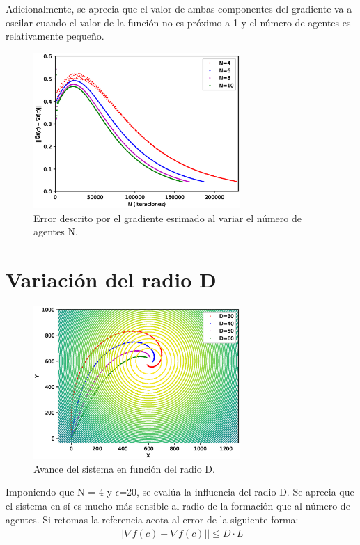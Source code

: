 Adicionalmente, se aprecia que el valor de ambas componentes del gradiente va a oscilar cuando el valor de la función no es próximo a 1 y el número de agentes es relativamente pequeño.

\begin{figure}[H]
\centering
\includegraphics[width=0.70\textwidth]{figures/Graficas_Nuevas/N/Figure_5.eps}
\caption{Error descrito por el gradiente esrimado al variar el número de agentes N.} \label{N_Var_Error}
\end{figure}

\section{Variación del radio D}

\begin{figure}[H]
\centering
\includegraphics[width=0.70\textwidth]{figures/Dif_R_BU/Figure_1.eps}
\caption{Avance del sistema en función del radio D.} \label{D_Var}
\end{figure}

Imponiendo que N = 4 y $\epsilon$=20, se evalúa la influencia del radio D. Se aprecia que el sistema en sí es mucho más sensible al radio de la formación que al número de agentes. Si retomas la referencia \cite{Adicional_Estimacion_1} acota al error de la siguiente forma:
\begin{equation}\label{Depe}
	||\hat{\nabla}f\left(c\right)-\nabla{f}\left(c\right)||\leqslant{D·L}
\end{equation}

